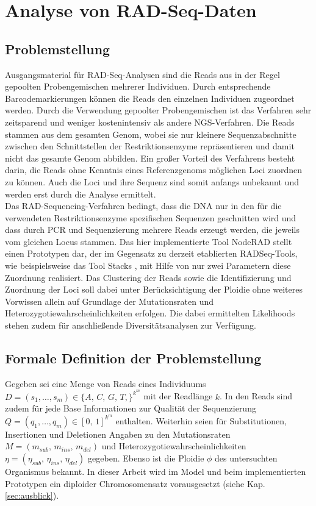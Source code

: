 \chapter{Analyse von RAD-Seq-Daten} \label{chapter:kap2}
\section{Problemstellung} \label{sec:probl}

Ausgangsmaterial für RAD-Seq-Analysen sind die Reads aus in der Regel gepoolten Probengemischen mehrerer Individuen. Durch entsprechende Barcodemarkierungen können die Reads den einzelnen Individuen zugeordnet werden. Durch die Verwendung gepoolter Probengemischen ist das Verfahren sehr zeitsparend und weniger kostenintensiv als andere NGS-Verfahren. Die Reads stammen aus dem gesamten Genom, wobei sie nur kleinere Sequenzabschnitte zwischen den Schnittstellen der Restriktionsenzyme repräsentieren und damit nicht das gesamte Genom abbilden. Ein großer Vorteil des Verfahrens besteht darin, die Reads ohne Kenntnis eines Referenzgenoms möglichen Loci zuordnen zu können. Auch die Loci und ihre Sequenz sind somit anfangs unbekannt und werden erst durch die Analyse ermittelt.\\

Das RAD-Sequencing-Verfahren bedingt, dass die DNA nur in den für die verwendeten Restriktionsenzyme spezifischen Sequenzen geschnitten wird und dass durch PCR und Sequenzierung mehrere Reads erzeugt werden, die jeweils vom gleichen Locus stammen. Das hier implementierte Tool NodeRAD stellt einen Prototypen dar, der im Gegensatz zu derzeit etablierten RADSeq-Tools, wie beispielsweise das Tool Stacks \cite{catchen_2013}, mit Hilfe von nur zwei Parametern diese Zuordnung realisiert. Das Clustering der Reads sowie die Identifizierung und Zuordnung der Loci soll dabei unter Berücksichtigung der Ploidie ohne weiteres Vorwissen allein auf Grundlage der Mutationsraten und  Heterozygotiewahrscheinlichkeiten erfolgen. Die dabei ermittelten Likelihoods stehen zudem für anschließende Diversitätsanalysen zur Verfügung.

\section{Formale Definition der Problemstellung} \label{sec:formal}

Gegeben sei eine Menge von Reads eines Individuums $ D = (s_{1}, \dots , s_{m}) \in \{A,\,C,\,G,\,T,\}^{k^m}$ mit der Readlänge $k$. In den Reads sind zudem für jede Base Informationen zur Qualität der Sequenzierung $ Q = (q_{1}, \dots , q_{m}) \in {[0,\,1]}^{k^m}$ enthalten. Weiterhin seien für Substitutionen, Insertionen und Deletionen Angaben zu den Mutationsraten $M=(m_{sub},\, m_{ins},\, m_{del})$ und Heterozygotiewahrscheinlichkeiten $\eta = (\eta_{sub},\, \eta_{ins},\, \eta_{del}) $ gegeben. Ebenso ist die Ploidie $\phi$ des untersuchten Organismus bekannt. In dieser Arbeit wird im Model und beim implementierten Prototypen ein diploider Chromosomensatz vorausgesetzt (siehe Kap. \ref{sec:ausblick}). \\

